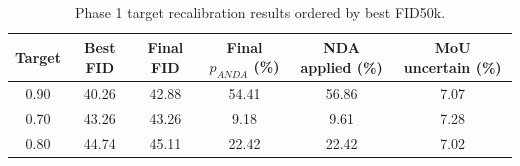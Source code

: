 \begin{table}[t]
\centering
\caption{Phase 1 target recalibration results ordered by best FID50k.}
\label{tab:phase1_best_fid}
\begin{tabular}{cccccc}
\hline
Target & Best FID & Final FID & Final $p_{ANDA}$ (\%) & NDA applied (\%) & MoU uncertain (\%) \\
\hline
0.90 & 40.26 & 42.88 & 54.41 & 56.86 & 7.07 \\
0.70 & 43.26 & 43.26 & 9.18 & 9.61 & 7.28 \\
0.80 & 44.74 & 45.11 & 22.42 & 22.42 & 7.02 \\
\hline
\end{tabular}
\end{table}

